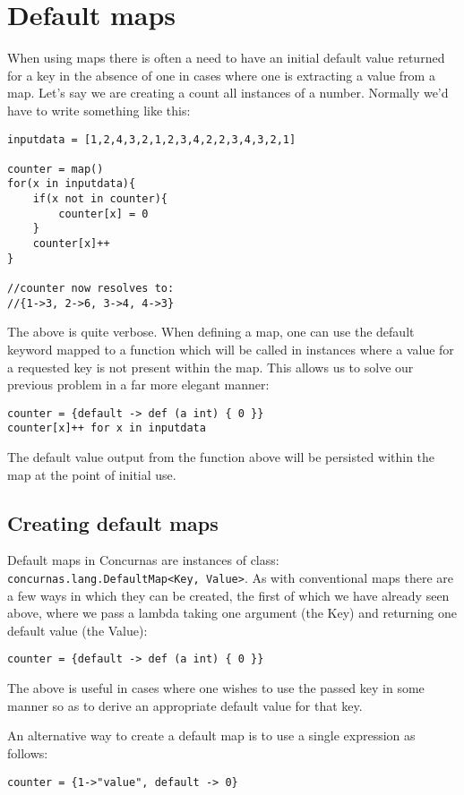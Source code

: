 \documentclass[conc-doc]{subfiles}
\begin{document}
\section{Default maps}
When using maps there is often a need to have an initial default value returned for a key in the absence of one in cases where one is extracting a value from a map. Let's say we are creating a count all instances of a number. Normally we'd have to write something like this:

\begin{lstlisting}
inputdata = [1,2,4,3,2,1,2,3,4,2,2,3,4,3,2,1]

counter = map()
for(x in inputdata){
	if(x not in counter){
		counter[x] = 0
	}
	counter[x]++
}

//counter now resolves to:
//{1->3, 2->6, 3->4, 4->3}
\end{lstlisting}

The above is quite verbose. When defining a map, one can use the default keyword mapped to a function which will be called in instances where a value for a requested key is not present within the map. This allows us to solve our previous problem in a far more elegant manner:

\begin{lstlisting}
counter = {default -> def (a int) { 0 }}
counter[x]++ for x in inputdata
\end{lstlisting}

The default value output from the function above will be persisted within the map at the point of initial use.

\subsection{Creating default maps}
Default maps in Concurnas are instances of class: \lstinline{concurnas.lang.DefaultMap<Key, Value>}. As with conventional maps there are a few ways in which they can be created, the first of which we have already seen above, where we pass a lambda taking one argument (the Key) and returning one default value (the Value):

\begin{lstlisting}
counter = {default -> def (a int) { 0 }}
\end{lstlisting}

The above is useful in cases where one wishes to use the passed key in some manner so as to derive an appropriate default value for that key.

An alternative way to create a default map is to use a single expression as follows:
\begin{lstlisting}
counter = {1->"value", default -> 0}
\end{lstlisting}
\end{document}
